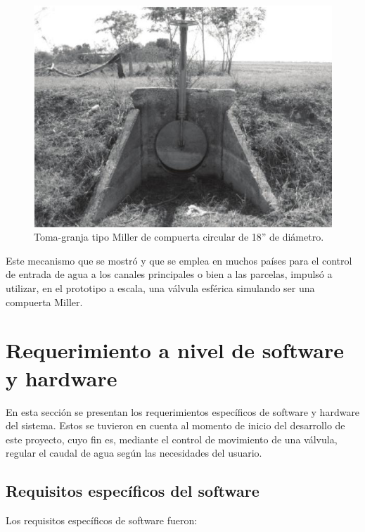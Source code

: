 \begin{figure}[htpb]
\centering
\includegraphics[scale=.65]{./Figures/compuertamillercircular.jpeg}
\caption{Toma-granja tipo Miller de compuerta circular de 18” de diámetro.}
\label{fig:Toma granja tipo miller de compuerta circular.}
\end{figure}

Este mecanismo que se mostró y que se emplea en muchos países para el control de entrada de agua a los canales principales o bien a las parcelas, impulsó a utilizar, en el prototipo a escala, una válvula esférica simulando ser una compuerta Miller.   

\section{Requerimiento a nivel de software y hardware}
\label{sec:ejemplo}
En esta sección se presentan los requerimientos específicos de software y hardware del sistema. Estos se tuvieron en cuenta al momento de inicio del desarrollo de este proyecto, cuyo fin es, mediante el control de movimiento de una válvula, regular el caudal de agua según las necesidades del usuario. 

\subsection{Requisitos específicos del software}
\label{subsec:ejemplo}
 Los requisitos específicos de software fueron:

